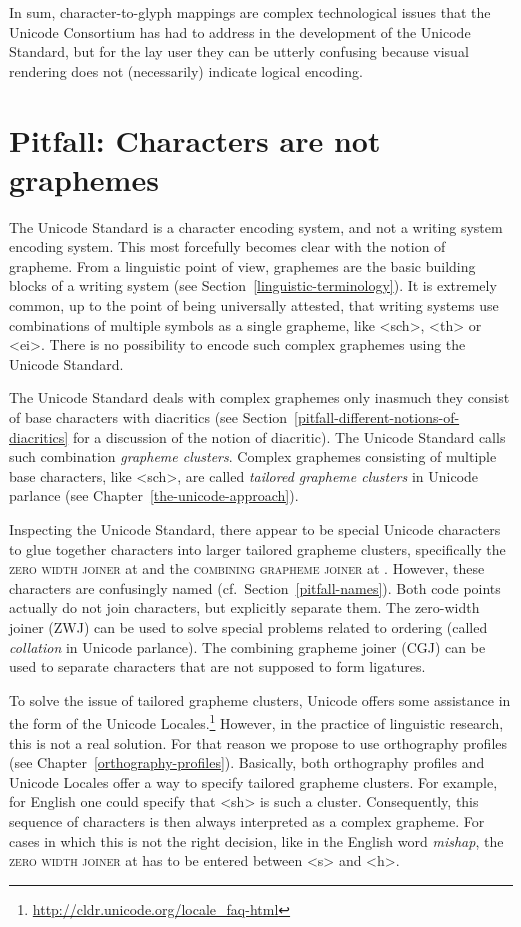 In sum, character-to-glyph mappings are complex technological issues that the
Unicode Consortium has had to address in the development of the Unicode
Standard, but for the lay user they can be utterly confusing because visual
rendering does not (necessarily) indicate logical encoding.

\section{Pitfall: Characters are not graphemes}
\label{pitfall-characters-are-not-graphemes}

The Unicode Standard is a character encoding system, and not a writing system
encoding system. This most forcefully becomes clear with the notion of grapheme.
From a linguistic point of view, graphemes are the basic building blocks of a
writing system (see Section~\ref{linguistic-terminology}). It is extremely
common, up to the point of being universally attested, that writing systems use
combinations of multiple symbols as a single grapheme, like <sch>, <th> or <ei>.
There is no possibility to encode such complex graphemes using the Unicode Standard.

The Unicode Standard deals with complex graphemes only inasmuch they consist of
base characters with diacritics (see
Section~\ref{pitfall-different-notions-of-diacritics} for a discussion of the
notion of diacritic). The Unicode Standard calls such combination \textit{grapheme
clusters}. Complex graphemes consisting of multiple base characters,
like <sch>, are called \textit{tailored grapheme clusters} in Unicode parlance (see
Chapter~\ref{the-unicode-approach}).

Inspecting the Unicode Standard, there appear to be special Unicode characters
to glue together characters into larger tailored grapheme clusters,
specifically the \textsc{zero width joiner} at  and the
\textsc{combining grapheme joiner} at . However, these characters are
confusingly named (cf.~Section~\ref{pitfall-names}). Both code points actually do
not join characters, but explicitly separate them. The zero-width joiner (ZWJ)
can be used to solve special problems related to ordering (called \textit{collation}
in Unicode parlance). The combining grapheme joiner (CGJ) can be used to
separate characters that are not supposed to form ligatures. 

To solve the issue of tailored grapheme clusters, Unicode offers some assistance
in the form of the Unicode Locales.\footnote{\url{http://cldr.unicode.org/locale_faq-html}} 
However, in the practice of
linguistic research, this is not a real solution. For that reason we propose to
use orthography profiles (see Chapter~\ref{orthography-profiles}). Basically,
both orthography profiles and Unicode Locales offer a way to specify
tailored grapheme clusters. For example, for English one could specify that <sh>
is such a cluster. Consequently, this sequence of characters is then always
interpreted as a complex grapheme. For cases in which this is not the right
decision, like in the English word \textit{mishap}, the \textsc{zero width
joiner} at  has to be entered between <s> and <h>.

